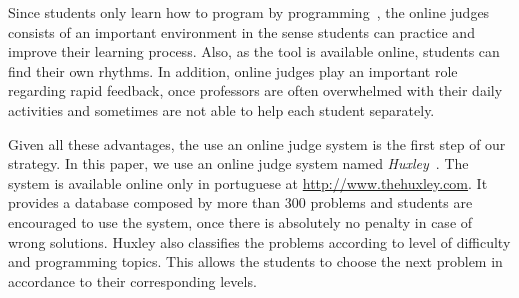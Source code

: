 Since students only learn how to program by programming~\cite{jenkins-ltsn02}, the online judges consists of an important environment in the sense students can practice and improve their learning process. Also, as the tool is available online, students can find their own rhythms. In addition, online judges play an important role regarding rapid feedback, once professors are often overwhelmed with their daily activities and sometimes are not able to help each student separately.

Given all these advantages, the use an online judge system is the first step of our strategy. In this paper, we use an online judge system named \textit{Huxley}~\cite{paes2013ferramenta}. The system is available online only in portuguese at \url{http://www.thehuxley.com}. It provides a database composed by more than 300 problems and students are encouraged to use the system, once there is absolutely no penalty in case of wrong solutions. Huxley also classifies the problems according to level of difficulty and programming topics. This allows the students to choose the next problem in accordance to their corresponding levels.




